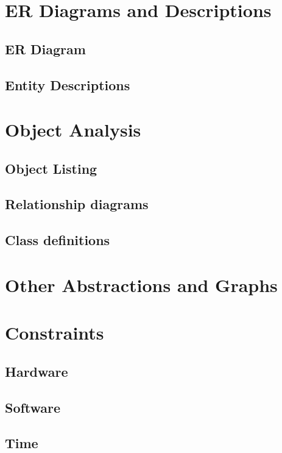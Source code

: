 \section{ER Diagrams and Descriptions}

\subsection{ER Diagram}

\subsection{Entity Descriptions}

\section{Object Analysis}

\subsection{Object Listing}

\subsection{Relationship diagrams}

\subsection{Class definitions}

\section{Other Abstractions and Graphs}

\section{Constraints}

\subsection{Hardware}

\subsection{Software}

\subsection{Time}

